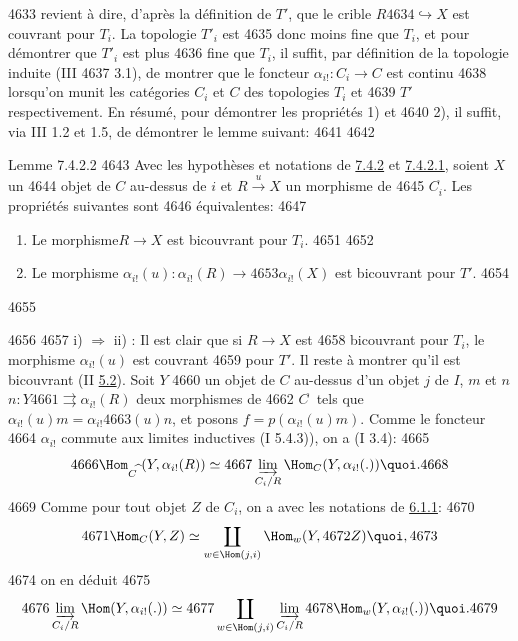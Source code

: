   4633	revient à dire, d'après la définition de $T'$, que le crible $R
  4634	\hookrightarrow X$ est couvrant pour $T_i$. La topologie $T'_i$ est
  4635	donc moins fine que $T_i$, et pour démontrer que $T'_i$ est plus
  4636	fine que $T_i$, il suffit, par définition de la topologie induite (III
  4637	3.1), de montrer que le foncteur $\alpha_{i!} : C_i \to C$ est continu
  4638	lorsqu'on munit les catégories $C_i$ et $C$ des topologies $T_i$ et
  4639	$T'$ respectivement. En résumé, pour démontrer les propriétés 1) et
  4640	2), il suffit, via III 1.2 et  1.5, de démontrer le lemme suivant:
  4641	
  4642	\begin{enonce*}{Lemme 7.4.2.2}
  4643	Avec les hypothèses et notations de \hyperref[VI.prop7.4.2]{7.4.2} et \hyperref[VI.par7.4.2.1]{7.4.2.1}, soient $X$ un
  4644	objet de $C$ au-dessus de $i$ et $R \xrightarrow{u} X$ un morphisme de
  4645	$C^{\widehat{\phantom{,}}}_i$. Les propriétés suivantes sont
  4646	équivalentes:
  4647	\begin{enumerate}
  4648	\renewcommand{\theenumi}{\roman{enumi}}
  4649	\renewcommand{\labelenumi}{\theenumi)}
  4650	\item Le morphisme\pageoriginale $R \to X$ est bicouvrant pour $T_i$.
  4651	
  4652	\item Le morphisme $\alpha_{i!}(u) : \alpha_{i!}(R) \to
  4653	  \alpha_{i!}(X)$ est bicouvrant pour $T'$.
  4654	\end{enumerate}
  4655	\end{enonce*}
  4656	
  4657	i) $\Rightarrow$ ii) : Il est clair que si $R \xrightarrow{} X$ est
  4658	bicouvrant pour $T_i$, le morphisme $\alpha_{i!} (u)$ est couvrant
  4659	pour $T'$. Il reste à montrer qu'il est bicouvrant (II \hyperref[VI.cor5.2]{5.2}). Soit $Y$
  4660	un objet de $C$ au-dessus d'un objet $j$ de $I$, $m$ et $n$ $n : Y
  4661	\rightrightarrows \alpha_{i!} (R)$ deux morphismes de
  4662	$C^{\widehat{\phantom{,}}}$ tels que $\alpha_{i!} (u) m = \alpha_{i!}
  4663	(u) n$, et posons $f = p(\alpha_{i!} (u)m)$. Comme le foncteur
  4664	$\alpha_{i!}$ commute aux limites inductives (I 5.4.3)), on a (I 3.4):
  4665	$$
  4666	\Hom_{C^{\widehat{\phantom{,}}}} (Y, \alpha_{i!} (R)) \simeq
  4667	\varinjlim_{C_{i}/R} \Hom_C (Y, \alpha_{i!} (.)){\quoi}.
  4668	$$
  4669	Comme pour tout objet $Z$ de $C_i$, on a avec les notations de \hyperref[VI.subsubsec6.1.1]{6.1.1}:
  4670	$$
  4671	\Hom_{C} (Y, Z) \simeq \coprod_{w \in \Hom(j, i)} \Hom_w (Y,
  4672	Z){\quoi},
  4673	$$
  4674	on en déduit
  4675	$$
  4676	\varinjlim_{C_{i}/R} \Hom (Y, \alpha_{i!} (.)) \simeq
  4677	\coprod_{w \in \Hom(j, i)} \varinjlim_{C_{i}/R}
  4678	\Hom_{w} (Y, \alpha_{i!} (.)){\quoi}.
  4679	$$
